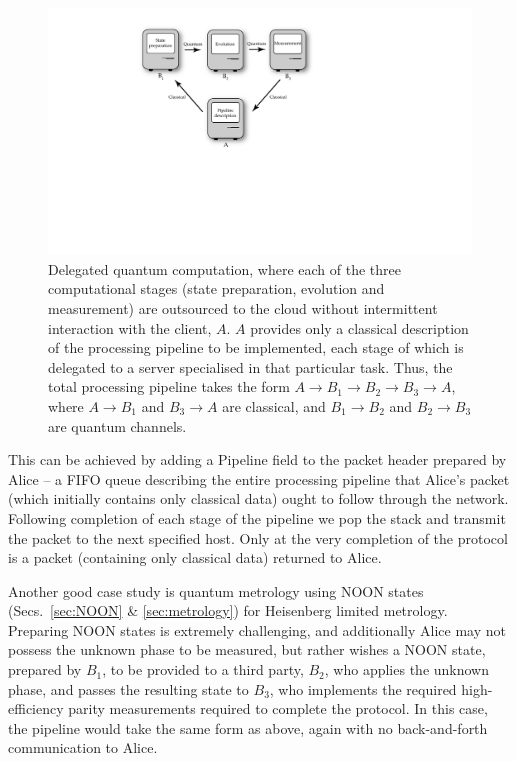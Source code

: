 \documentclass[aps,rmp,twocolumn,amsmath,amssymb,nofootinbib,superscriptaddress,longbibliography,floatfix]{revtex4-1}
\begin{document}
\begin{figure}[!htb]
\includegraphics[width=\columnwidth]{delegated}
\caption{Delegated quantum computation, where each of the three computational stages (state preparation, evolution and measurement) are outsourced to the cloud without intermittent interaction with the client, $A$. $A$ provides only a classical description of the processing pipeline to be implemented, each stage of which is delegated to a server specialised in that particular task. Thus, the total processing pipeline takes the form \mbox{$A\to B_1\to B_2\to B_3\to A$}, where \mbox{$A\to B_1$} and \mbox{$B_3\to A$} are classical, and \mbox{$B_1\to B_2$} and \mbox{$B_2\to B_3$} are quantum channels.} \label{fig:delegated}
\end{figure}

This can be achieved by adding a {\sc Pipeline} field to the packet header prepared by Alice -- a FIFO queue describing the entire processing pipeline that Alice's packet (which initially contains only classical data) ought to follow through the network. Following completion of each stage of the pipeline we pop the stack and transmit the packet to the next specified host. Only at the very completion of the protocol is a packet (containing only classical data) returned to Alice.

Another good case study is quantum metrology using NOON states (Secs.~\ref{sec:NOON} \& \ref{sec:metrology}) for Heisenberg limited metrology. Preparing NOON states is extremely challenging, and additionally Alice may not possess the unknown phase to be measured, but rather wishes a NOON state, prepared by $B_1$, to be provided to a third party, $B_2$, who applies the unknown phase, and passes the resulting state to $B_3$, who implements the required high-efficiency parity measurements required to complete the protocol. In this case, the pipeline would take the same form as above, again with no back-and-forth communication to Alice.
\end{document}

